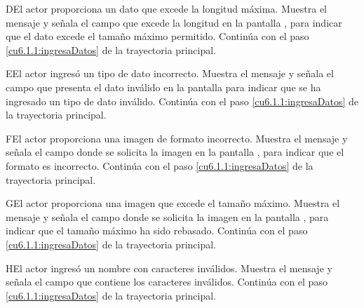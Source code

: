  \begin{UCtrayectoriaA}{D}{El actor proporciona un dato que excede la longitud máxima.}
    \UCpaso[\UCsist] Muestra el mensaje  y señala el campo que excede la 
    longitud en la pantalla , para indicar que el dato excede el tamaño máximo permitido.
    \UCpaso[] Continúa con el paso \ref{cu6.1.1:ingresaDatos} de la trayectoria principal.
 \end{UCtrayectoriaA}
 \begin{UCtrayectoriaA}{E}{El actor ingresó un tipo de dato incorrecto.}
    \UCpaso[\UCsist] Muestra el mensaje  y señala el campo que presenta el dato inválido en la 
    pantalla  para indicar que se ha ingresado un tipo de dato inválido.
    \UCpaso[] Continúa con el paso \ref{cu6.1.1:ingresaDatos} de la trayectoria principal.
 \end{UCtrayectoriaA}
 \begin{UCtrayectoriaA}{F}{El actor proporciona una imagen de formato incorrecto.}
    \UCpaso[\UCsist] Muestra el mensaje  y señala el campo donde se solicita la imagen
    en la pantalla , para indicar que el formato es incorrecto.
    \UCpaso[] Continúa con el paso \ref{cu6.1.1:ingresaDatos} de la trayectoria principal.
 \end{UCtrayectoriaA}
 
 \begin{UCtrayectoriaA}{G}{El actor proporciona una imagen que excede el tamaño máximo.}
    \UCpaso[\UCsist] Muestra el mensaje  y señala el campo donde se solicita la imagen
    en la pantalla , para indicar que el tamaño máximo ha sido rebasado.
    \UCpaso[] Continúa con el paso \ref{cu6.1.1:ingresaDatos} de la trayectoria principal.
 \end{UCtrayectoriaA}
 \begin{UCtrayectoriaA}{H}{El actor ingresó un nombre con caracteres inválidos.}
    \UCpaso[\UCsist] Muestra el mensaje  y señala el campo que contiene los caracteres inválidos.
    \UCpaso[] Continúa con el paso \ref{cu6.1.1:ingresaDatos} de la trayectoria principal.
 \end{UCtrayectoriaA}
